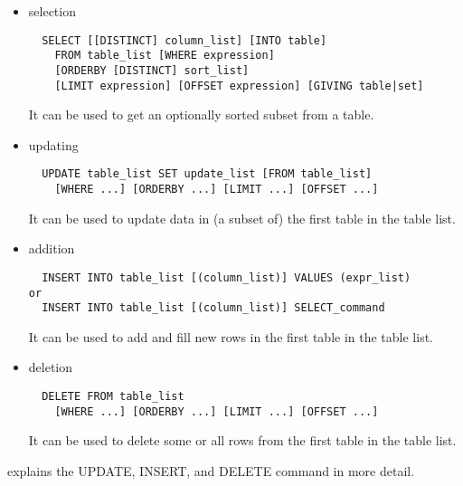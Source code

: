 \begin{itemize}
\item selection
\begin{verbatim}
  SELECT [[DISTINCT] column_list] [INTO table]
    FROM table_list [WHERE expression]
    [ORDERBY [DISTINCT] sort_list]
    [LIMIT expression] [OFFSET expression] [GIVING table|set]
\end{verbatim}
It can be used to get an optionally sorted subset from a table.

\item updating
\begin{verbatim}
  UPDATE table_list SET update_list [FROM table_list]
    [WHERE ...] [ORDERBY ...] [LIMIT ...] [OFFSET ...]
\end{verbatim}
It can be used to update data in (a subset of) the first table in the
table list. 

\item addition
\begin{verbatim}
  INSERT INTO table_list [(column_list)] VALUES (expr_list)
or
  INSERT INTO table_list [(column_list)] SELECT_command
\end{verbatim}
It can be used to add and fill new rows in the first table in the
table list.

\item deletion
\begin{verbatim}
  DELETE FROM table_list
    [WHERE ...] [ORDERBY ...] [LIMIT ...] [OFFSET ...]
\end{verbatim}
It can be used to delete some or all rows from the first table
in the table list.
\end{itemize}
 explains the
UPDATE, INSERT, and DELETE command in more detail.

